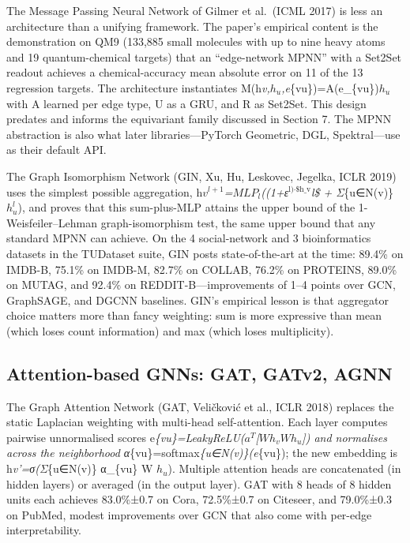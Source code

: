 \documentclass{article}
\providecommand{\textsuperscript}[1]{\ensuremath{^{\text{#1}}}}
\begin{document}
The Message Passing Neural Network of Gilmer et al.~(ICML 2017) is less an architecture than a unifying framework. The paper's empirical content is the demonstration on QM9 (133,885 small molecules with up to nine heavy atoms and 19 quantum-chemical targets) that an ``edge-network MPNN'' with a Set2Set readout achieves a chemical-accuracy mean absolute error on 11 of the 13 regression targets. The architecture instantiates M(h\emph{v,\(h_u\),e}\{vu\})=A(e\_\{vu\})\(h_u\) with A learned per edge type, U as a GRU, and R as Set2Set. This design predates and informs the equivariant family discussed in Section 7. The MPNN abstraction is also what later libraries---PyTorch Geometric, DGL, Spektral---use as their default API.

The Graph Isomorphism Network (GIN, Xu, Hu, Leskovec, Jegelka, ICLR 2019) uses the simplest possible aggregation, h\emph{\(v^{l+1}\)=\(MLP_l\)((1+ε\textsuperscript{l)·\$h\_v}l\$ + Σ}\{u∈N(v)\} \(h_u^l\)), and proves that this sum-plus-MLP attains the upper bound of the 1-Weisfeiler--Lehman graph-isomorphism test, the same upper bound that any standard MPNN can achieve. On the 4 social-network and 3 bioinformatics datasets in the TUDataset suite, GIN posts state-of-the-art at the time: 89.4\% on IMDB-B, 75.1\% on IMDB-M, 82.7\% on COLLAB, 76.2\% on PROTEINS, 89.0\% on MUTAG, and 92.4\% on REDDIT-B---improvements of 1--4 points over GCN, GraphSAGE, and DGCNN baselines. GIN's empirical lesson is that aggregator choice matters more than fancy weighting: sum is more expressive than mean (which loses count information) and max (which loses multiplicity).

\subsection{Attention-based GNNs: GAT, GATv2, AGNN}\label{attention-based-gnns-gat-gatv2-agnn}

The Graph Attention Network (GAT, Veličković et al., ICLR 2018) replaces the static Laplacian weighting with multi-head self-attention. Each layer computes pairwise unnormalised scores e\emph{\{vu\}=LeakyReLU(\(a^T\){[}\(Wh_v\)\textbar\textbar{}\(Wh_u\){]}) and normalises across the neighborhood α}\{vu\}=softmax\emph{\{u∈N(v)\}(e}\{vu\}); the new embedding is h\emph{v'=σ(Σ}\{u∈N(v)\} α\_\{vu\} W \(h_u\)). Multiple attention heads are concatenated (in hidden layers) or averaged (in the output layer). GAT with 8 heads of 8 hidden units each achieves 83.0\%±0.7 on Cora, 72.5\%±0.7 on Citeseer, and 79.0\%±0.3 on PubMed, modest improvements over GCN that also come with per-edge interpretability.
\end{document}
